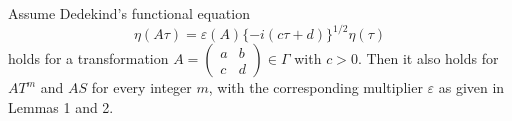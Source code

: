 Assume Dedekind's functional equation
$$
\eta(A\tau) = \varepsilon(A) \{-i(c\tau + d)\}^{1/2} \eta(\tau)
$$
holds for a transformation $A = \begin{pmatrix} a & b \\ c & d \end{pmatrix} \in \Gamma$ with $c > 0$. Then it also holds for $A T^m$ and $A S$ for every integer $m$, with the corresponding multiplier $\varepsilon$ as given in Lemmas 1 and 2.
